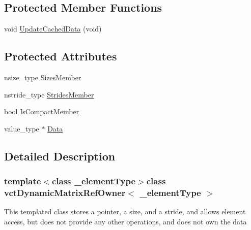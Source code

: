 \subsection*{Protected Member Functions}
\begin{DoxyCompactItemize}
\item 
void \hyperlink{classvct_dynamic_matrix_ref_owner_afd48cfac1a3604f1dd3b0cc09c1a8db4}{Update\-Cached\-Data} (void)
\end{DoxyCompactItemize}
\subsection*{Protected Attributes}
\begin{DoxyCompactItemize}
\item 
nsize\-\_\-type \hyperlink{classvct_dynamic_matrix_ref_owner_a5b7725d1ef65ac16c0360b94c09f4a01}{Sizes\-Member}
\item 
nstride\-\_\-type \hyperlink{classvct_dynamic_matrix_ref_owner_a90a7ffe471468b4df2e172b824e54b18}{Strides\-Member}
\item 
bool \hyperlink{classvct_dynamic_matrix_ref_owner_a80b9ceef73131dead623c3e86f4f22a4}{Is\-Compact\-Member}
\item 
value\-\_\-type $\ast$ \hyperlink{classvct_dynamic_matrix_ref_owner_a465f02e69e93e00a9fd586e4d89b6850}{Data}
\end{DoxyCompactItemize}


\subsection{Detailed Description}
\subsubsection*{template$<$class \-\_\-element\-Type$>$class vct\-Dynamic\-Matrix\-Ref\-Owner$<$ \-\_\-element\-Type $>$}

This templated class stores a pointer, a size, and a stride, and allows element access, but does not provide any other operations, and does not own the data 

